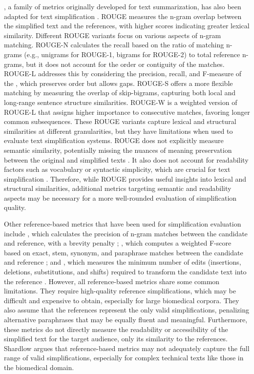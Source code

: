 , a family of metrics originally developed for text summarization, has also been adapted for text simplification \cite{xu-etal-2016-optimizing}.
ROUGE measures the n-gram overlap between the simplified text and the references, with higher scores indicating greater lexical similarity.
Different ROUGE variants focus on various aspects of n-gram matching.
ROUGE-N calculates the recall based on the ratio of matching n-grams (e.g., unigrams for ROUGE-1, bigrams for ROUGE-2) to total reference n-grams, but it does not account for the order or contiguity of the matches. 
ROUGE-L addresses this by considering the precision, recall, and F-measure of the , which preserves order but allows gaps. 
ROUGE-S offers a more flexible matching by measuring the overlap of skip-bigrams, capturing both local and long-range sentence structure similarities. 
ROUGE-W is a weighted version of ROUGE-L that assigns higher importance to consecutive matches, favoring longer common subsequences.
These ROUGE variants capture lexical and structural similarities at different granularities, but they have limitations when used to evaluate text simplification systems. 
ROUGE does not explicitly measure semantic similarity, potentially missing the nuances of meaning preservation between the original and simplified texts \cite{?}.
It also does not account for readability factors such as vocabulary or syntactic simplicity, which are crucial for text simplification \cite{?}.
Therefore, while ROUGE provides useful insights into lexical and structural similarities, additional metrics targeting semantic and readability aspects may be necessary for a more well-rounded evaluation of simplification quality.

Other reference-based metrics that have been used for simplification evaluation include , which calculates the precision of n-gram matches between the candidate and reference, with a brevity penalty \cite{papineni-etal-2002-bleu}; , which computes a weighted F-score based on exact, stem, synonym, and paraphrase matches between the candidate and reference \cite{banerjee-lavie-2005-meteor}; and , which measures the minimum number of edits (insertions, deletions, substitutions, and shifts) required to transform the candidate text into the reference \cite{snover-etal-2006-study}.
However, all reference-based metrics share some common limitations. 
They require high-quality reference simplifications, which may be difficult and expensive to obtain, especially for large biomedical corpora. 
They also assume that the references represent the only valid simplifications, penalizing alternative paraphrases that may be equally fluent and meaningful. 
Furthermore, these metrics do not directly measure the readability or accessibility of the simplified text for the target audience, only its similarity to the references. 
Shardlow \cite{Shardlow2014} argues that reference-based metrics may not adequately capture the full range of valid simplifications, especially for complex technical texts like those in the biomedical domain.

